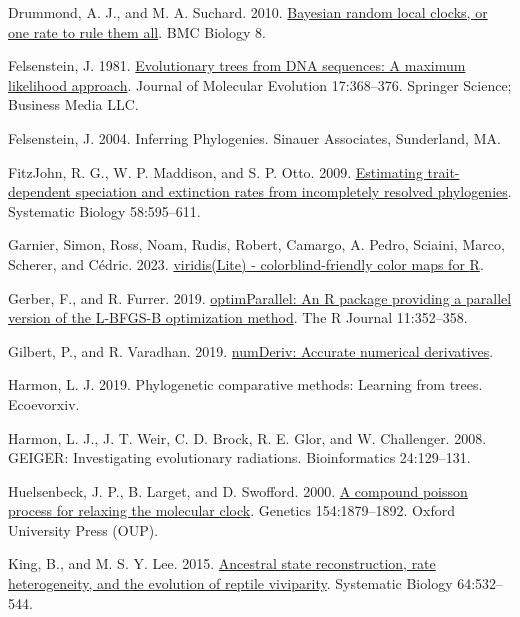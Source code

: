 \documentclass[fleqn,10pt,lineno]{wlpeerj} %
\newlength{\cslhangindent}
\newenvironment{CSLReferences}[2] %
 {\begin{list}{}{%
  \setlength{\itemindent}{0pt}
  \setlength{\leftmargin}{0pt}
  \setlength{\parsep}{0pt}
  \ifodd #1
   \setlength{\leftmargin}{\cslhangindent}
   \setlength{\itemindent}{-1\cslhangindent}
  \fi
  \setlength{\itemsep}{#2\baselineskip}}}
 {\end{list}}
\begin{document}
\begin{CSLReferences}{1}{0}
Drummond, A. J., and M. A. Suchard. 2010. \href{https://doi.org/10.1186/1741-7007-8-114}{Bayesian random local clocks, or one rate to rule them all}. {BMC} Biology 8.

Felsenstein, J. 1981. \href{https://doi.org/10.1007/bf01734359}{Evolutionary trees from DNA sequences: A maximum likelihood approach}. Journal of Molecular Evolution 17:368--376. Springer Science; Business Media LLC.

Felsenstein, J. 2004. {Inferring Phylogenies}. {Sinauer Associates}, Sunderland, MA.

FitzJohn, R. G., W. P. Maddison, and S. P. Otto. 2009. \href{https://doi.org/10.1093/sysbio/syp067}{Estimating trait-dependent speciation and extinction rates from incompletely resolved phylogenies}. Systematic Biology 58:595--611.

Garnier, Simon, Ross, Noam, Rudis, Robert, Camargo, A. Pedro, Sciaini, Marco, Scherer, and Cédric. 2023. \href{https://doi.org/10.5281/zenodo.4678327}{{viridis(Lite)} - colorblind-friendly color maps for {R}}.

Gerber, F., and R. Furrer. 2019. \href{https://doi.org/10.32614/RJ-2019-030}{optimParallel: An {R} package providing a parallel version of the {L}-BFGS-{B} optimization method}. The R Journal 11:352--358.

Gilbert, P., and R. Varadhan. 2019. \href{https://CRAN.R-project.org/package=numDeriv}{numDeriv: Accurate numerical derivatives}.

Harmon, L. J. 2019. Phylogenetic comparative methods: Learning from trees. Ecoevorxiv.

Harmon, L. J., J. T. Weir, C. D. Brock, R. E. Glor, and W. Challenger. 2008. {GEIGER}: Investigating evolutionary radiations. Bioinformatics 24:129--131.

Huelsenbeck, J. P., B. Larget, and D. Swofford. 2000. \href{https://doi.org/10.1093/genetics/154.4.1879}{A compound poisson process for relaxing the molecular clock}. Genetics 154:1879--1892. Oxford University Press (OUP).

King, B., and M. S. Y. Lee. 2015. \href{https://doi.org/10.1093/sysbio/syv005}{Ancestral state reconstruction, rate heterogeneity, and the evolution of reptile viviparity}. Systematic Biology 64:532--544.


\end{CSLReferences}
\end{document}
